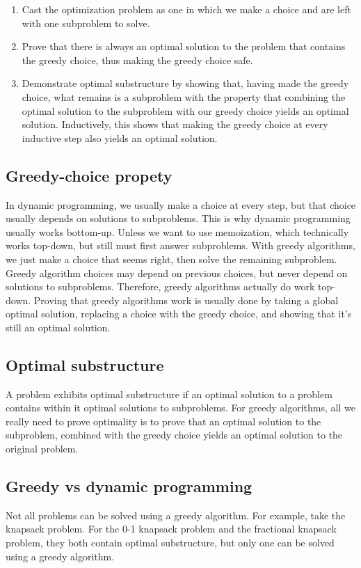 \documentclass[11pt]{article}
\theoremstyle{definition}
\begin{document}
\begin{enumerate}
\item Cast the optimization problem as one in which we make a choice and are left with one subproblem 
  to solve.
\item Prove that there is always an optimal solution to the problem that contains the greedy choice, 
  thus making the greedy choice safe.
\item Demonstrate optimal substructure by showing that, having made the greedy choice, what remains 
  is a subproblem with the property that combining the optimal solution to the subproblem with our 
  greedy choice yields an optimal solution.  Inductively, this shows that making the greedy choice 
  at every inductive step also yields an optimal solution.
\end{enumerate}

\subsection*{Greedy-choice propety}
In dynamic programming, we usually make a choice at every step, but that choice usually depends on 
solutions to subproblems.  This is why dynamic programming usually works bottom-up.  Unless we 
want to use memoization, which technically works top-down, but still must first answer subproblems. 
With greedy algorithms, we just make a choice that seems right, then solve the remaining 
subproblem.  Greedy algorithm choices may depend on previous choices, but never depend on 
solutions to subproblems.  Therefore, greedy algorithms actually do work top-down.  Proving 
that greedy algorithms work is usually done by taking a global optimal solution, replacing a choice 
with the greedy choice, and showing that it's still an optimal solution.

\subsection*{Optimal substructure}
A problem exhibits optimal substructure if an optimal solution to a problem contains within it 
optimal solutions to subproblems.  For greedy algorithms, all we really need to prove optimality is 
to prove that an optimal solution to the subproblem, combined with the greedy choice yields an 
optimal solution to the original problem.

\subsection*{Greedy vs dynamic programming}
Not all problems can be solved using a greedy algorithm.  For example, take the knapsack problem. 
For the 0-1 knapsack problem and the fractional knapsack problem, they both contain optimal 
substructure, but only one can be solved using a greedy algorithm.
\end{document}
